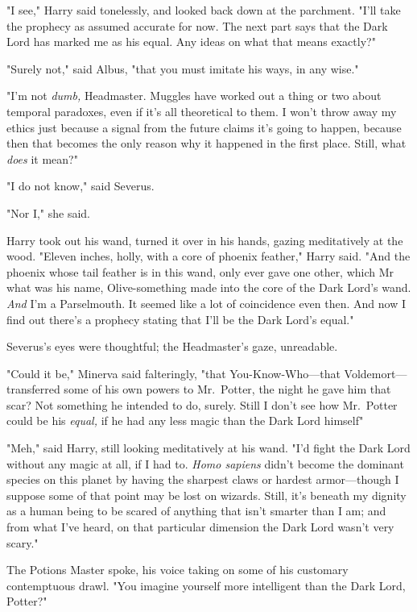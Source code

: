 "I see," Harry said tonelessly, and looked back down at the parchment. "I'll
take the prophecy as assumed accurate for now. The next part says that the Dark
Lord has marked me as his equal. Any ideas on what that means exactly?"

"Surely not," said Albus, "that you must imitate his ways, in any wise."

"I'm not \emph{dumb,} Headmaster. Muggles have worked out a thing or two about
temporal paradoxes, even if it's all theoretical to them. I won't throw away my
ethics just because a signal from the future claims it's going to happen,
because then that becomes the only reason why it happened in the first place.
Still, what \emph{does} it mean?"

"I do not know," said Severus.

"Nor I," she said.

Harry took out his wand, turned it over in his hands, gazing meditatively at
the wood. "Eleven inches, holly, with a core of phoenix feather," Harry said.
"And the phoenix whose tail feather is in this wand, only ever gave one other,
which Mr{\el} what was his name, Olive-something{\el} made into the core
of the Dark Lord's wand. \emph{And} I'm a Parselmouth. It seemed like a lot of
coincidence even then. And now I find out there's a prophecy stating that I'll
be the Dark Lord's equal."

Severus's eyes were thoughtful; the Headmaster's gaze, unreadable.

"Could it be," Minerva said falteringly, "that You-Know-Who---that
Voldemort---transferred some of his own powers to Mr.~Potter, the night he gave
him that scar? Not something he intended to do, surely. Still{\el} I don't
see how Mr.~Potter could be his \emph{equal,} if he had any less magic than the
Dark Lord himself{\el}"

"Meh," said Harry, still looking meditatively at his wand. "I'd fight the Dark
Lord without any magic at all, if I had to. \emph{Homo sapiens} didn't become
the dominant species on this planet by having the sharpest claws or hardest
armor---though I suppose some of that point may be lost on wizards. Still, it's
beneath my dignity as a human being to be scared of anything that isn't smarter
than I am; and from what I've heard, on that particular dimension the Dark Lord
wasn't very scary."

The Potions Master spoke, his voice taking on some of his customary
contemptuous drawl. "You imagine yourself more intelligent than the Dark Lord,
Potter?"

